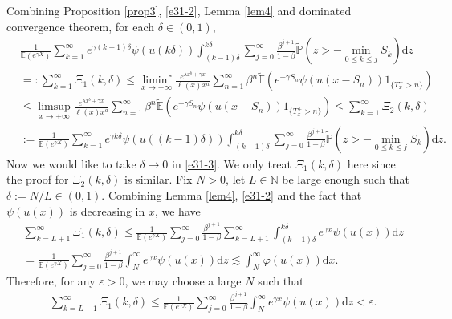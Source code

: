 \documentclass[11pt]{article}
\numberwithin{equation}{section}
\begin{document}
Combining Proposition \ref{prop3}, \eqref{e31-2}, Lemma \ref{lem4} and dominated convergence theorem, for each $\delta\in (0,1)$,
\begin{align}\label{e31-3}
	& \frac{1}{\mathbb{E}(e^{\gamma X})} \sum_{k=1}^\infty e^{\gamma (k-1)\delta}\psi(u(k\delta)) \int_{(k-1)\delta}^{k\delta} \sum_{j=0}^\infty \frac{\beta^{j+1}}{1-\beta} \widetilde{\mathbb{P}}\left(z> -\min_{0\leq k\leq j} S_k \right)\mathrm{d} z\nonumber\\
	&=: \sum_{k=1}^\infty \Xi_1(k, \delta)  \leq \liminf_{x\to+\infty} \frac{e^{\lambda x^b+\gamma x}}{\ell(x)x^a } \sum_{n=1}^\infty \beta^{n}\widetilde{\mathbb{E}}\left(e^{-\gamma S_n} \psi\left(u(x-S_n)\right)1_{\{T_x^+>n\}}\right) \nonumber\\
	&\leq \limsup_{x\to+\infty} \frac{e^{\lambda x^b+\gamma x}}{\ell(x)x^a } \sum_{n=1}^\infty \beta^{n}\widetilde{\mathbb{E}}\left(e^{-\gamma S_n} \psi\left(u(x-S_n)\right)1_{\{T_x^+>n\}}\right)  \leq \sum_{k=1}^\infty \Xi_2(k, \delta)  \nonumber\\
	&:= \frac{1}{\mathbb{E}(e^{\gamma X})} \sum_{k=1}^\infty e^{\gamma k\delta}\psi(u((k-1)\delta)) \int_{(k-1)\delta}^{k\delta} \sum_{j=0}^\infty \frac{\beta^{j+1}}{1-\beta} \widetilde{\mathbb{P}}\left(z> -\min_{0\leq k\leq j} S_k \right)\mathrm{d} z.
\end{align}
Now we would like to take $\delta\to0$ in  \eqref{e31-3}. We only treat   $\Xi_1(k,\delta)$ here since the proof for $\Xi_2(k,\delta)$  is similar. Fix $N>0$, let $L\in \mathbb{N}$ be large enough such that  $\delta:= N/L \in (0,1)$. Combining Lemma \ref{lem4}, \eqref{e31-2} and the fact that $\psi(u(x))$ is decreasing in $x$, we have 
\begin{align}
	&\sum_{k=L+1}^\infty \Xi_1(k, \delta) \leq \frac{1}{\mathbb{E}(e^{\gamma X})} \sum_{j=0}^\infty \frac{\beta^{j+1}}{1-\beta}  \sum_{k=L+1}^\infty  \int_{(k-1)\delta}^{k\delta} e^{\gamma x}\psi(u(x)) \mathrm{d} z\nonumber\\
	&=  \frac{1}{\mathbb{E}(e^{\gamma X})}\sum_{j=0}^\infty \frac{\beta^{j+1}}{1-\beta}  \int_{N}^{\infty} e^{\gamma x}\psi(u(x))\mathrm{d} z  \lesssim  \int_N^\infty \varphi(u(x))\mathrm{d}x.
\end{align}
Therefore, for any $\varepsilon>0$, we may choose a large $N$ such that 
\begin{align}\label{e32-1}
	& \sum_{k=L+1}^\infty \Xi_1(k, \delta)\leq  \frac{1}{\mathbb{E}(e^{\gamma X})} \sum_{j=0}^\infty \frac{\beta^{j+1}}{1-\beta}  \int_{N}^{\infty} e^{\gamma x}\psi(u(x))\mathrm{d} z  <\varepsilon.
\end{align}
\end{document}
